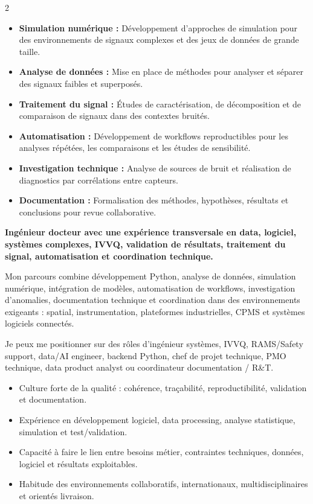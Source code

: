 \documentclass[8pt,a4paper,ragged2e,withhyper]{../_shared/altacv}
\begin{document}
\begin{paracol}{2}
\begin{itemize}
  \item \textbf{Simulation numérique :} Développement d'approches de simulation pour des environnements de signaux complexes et des jeux de données de grande taille.
  \item \textbf{Analyse de données :} Mise en place de méthodes pour analyser et séparer des signaux faibles et superposés.
  \item \textbf{Traitement du signal :} Études de caractérisation, de décomposition et de comparaison de signaux dans des contextes bruités.
  \item \textbf{Automatisation :} Développement de workflows reproductibles pour les analyses répétées, les comparaisons et les études de sensibilité.
  \item \textbf{Investigation technique :} Analyse de sources de bruit et réalisation de diagnostics par corrélations entre capteurs.
  \item \textbf{Documentation :} Formalisation des méthodes, hypothèses, résultats et conclusions pour revue collaborative.
\end{itemize}

\switchcolumn


\textbf{Ingénieur docteur avec une expérience transversale en data, logiciel, systèmes complexes, IVVQ, validation de résultats, traitement du signal, automatisation et coordination technique.}

Mon parcours combine développement Python, analyse de données, simulation numérique, intégration de modèles, automatisation de workflows, investigation d'anomalies, documentation technique et coordination dans des environnements exigeants : spatial, instrumentation, plateformes industrielles, CPMS et systèmes logiciels connectés.

Je peux me positionner sur des rôles d'ingénieur systèmes, IVVQ, RAMS/Safety support, data/AI engineer, backend Python, chef de projet technique, PMO technique, data product analyst ou coordinateur documentation / R\&T.

\begin{itemize}
  \item Culture forte de la qualité : cohérence, traçabilité, reproductibilité, validation et documentation.
  \item Expérience en développement logiciel, data processing, analyse statistique, simulation et test/validation.
  \item Capacité à faire le lien entre besoins métier, contraintes techniques, données, logiciel et résultats exploitables.
  \item Habitude des environnements collaboratifs, internationaux, multidisciplinaires et orientés livraison.
\end{itemize}


\end{paracol}
\end{document}
